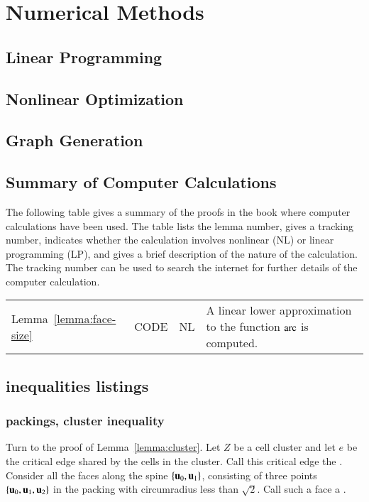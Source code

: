 %
\chapter{Numerical Methods}

\section{Linear Programming}

\section{Nonlinear Optimization}

\section{Graph Generation}

\section{Summary of Computer Calculations}

The following table gives a summary of the proofs in the book where computer calculations have been
used.   The table lists the lemma number, gives a tracking number, indicates whether the calculation involves nonlinear (NL) or linear programming (LP),  and gives a brief description of the nature of the calculation.  The  tracking number can be used to search the internet for further details of the computer calculation.


\begin{tabular}{llll}
Lemma~\ref{lemma:face-size}&CODE&NL&A linear lower approximation to the function $\operatorname{arc}$ is computed.\\
\end{tabular}


\section{inequalities listings}

\subsection{packings, cluster inequality}


Turn to the proof of Lemma~\ref{lemma:cluster}.  Let $Z$ be a cell
cluster and let $e$ be the critical edge shared by the cells in the
cluster.  Call this critical edge the .  Consider all
the faces along the spine $\{ {\mathbf u}_0, {\mathbf u}_1\}$, consisting of three
points $\{ {\mathbf u}_0, {\mathbf u}_1, {\mathbf u}_2\}$ in the packing with circumradius less
than $\sqrt2$.  Call such a face a . 
%
%
%

